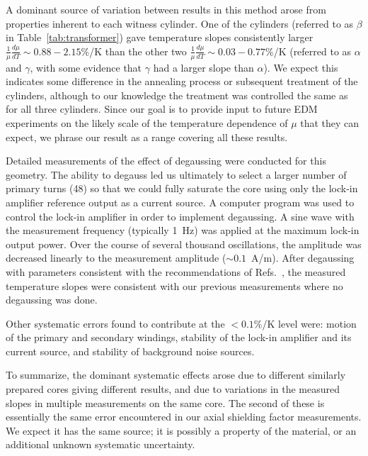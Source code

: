 A dominant source of variation between results in this method arose
from properties inherent to each witness cylinder.  One of the
cylinders (referred to as $\beta$ in Table~\ref{tab:transformer}) gave
temperature slopes consistently larger
$\frac{1}{\mu}\frac{d\mu}{dT}\sim 0.88-2.15$\%/K than the other two
$\frac{1}{\mu}\frac{d\mu}{dT}\sim 0.03-0.77$\%/K (referred to as
$\alpha$ and $\gamma$, with some evidence that $\gamma$ had a larger
slope than $\alpha$).  We expect this indicates some difference in the
annealing process or subsequent treatment of the cylinders, although
to our knowledge the treatment was controlled the same as for all
three cylinders.  Since our goal is to provide input to future EDM
experiments on the likely scale of the temperature dependence of $\mu$
that they can expect, we phrase our result as a range covering all
these results.

Detailed measurements of the effect of degaussing were conducted for
this geometry.  The ability to degauss led us ultimately to select a
larger number of primary turns (48) so that we could fully saturate
the core using only the lock-in amplifier reference output as a
current source.  A computer program was used to control the lock-in
amplifier in order to implement degaussing.  A sine wave with the
measurement frequency (typically 1~Hz) was applied at the maximum
lock-in output power.  Over the course of several thousand
oscillations, the amplitude was decreased linearly to the measurement
amplitude ($\sim 0.1$~A/m).  After degaussing with parameters
consistent with the recommendations of
Refs.~\cite{thiel2007demagnetization,altarev2015minimizing}, the measured temperature
slopes were consistent with our previous measurements where no
degaussing was done.

Other systematic errors found to contribute at the $<0.1\%$/K level
were: motion of the primary and secondary windings, stability of the
lock-in amplifier and its current source, and stability of background
noise sources.

To summarize, the dominant systematic effects arose due to different
similarly prepared cores giving different results, and due to
variations in the measured slopes in multiple measurements on the same
core.  The second of these is essentially the same error encountered
in our axial shielding factor measurements.  We expect it has the same
source; it is possibly a property of the material, or an additional
unknown systematic uncertainty.
